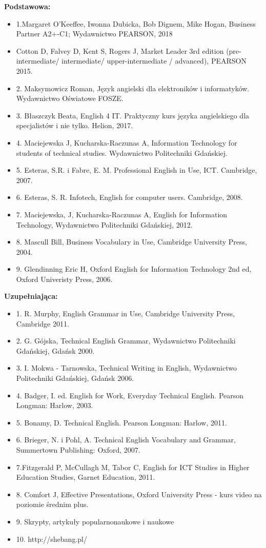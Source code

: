 \documentclass[12pt, a4paper]{article}
\begin{document}
\textbf{Podstawowa:}
\begin{itemize}
  \item 1.Margaret O’Keeffee, Iwonna Dubicka, Bob Dignem, Mike Hogan, Business Partner A2+-C1; Wydawnictwo PEARSON, 2018
  \item Cotton D, Falvey D, Kent S, Rogers J, Market Leader 3rd edition (pre-intermediate/ intermediate/ upper-intermediate / advanced), PEARSON 2015.
  \item 2. Maksymowicz Roman, Język angielski dla elektroników i informatyków. Wydawnictwo Oświatowe FOSZE.
  \item 3. Błaszczyk Beata, English 4 IT. Praktyczny kurs języka angielskiego dla specjalistów i nie tylko. Helion, 2017.
  \item 4. Maciejewska J, Kucharska-Raczunas A, Information Technology for students of technical studies. Wydawnictwo Politechniki Gdańskiej.
  \item 5. Esteras, S.R. i Fabre, E. M. Professional English in Use, ICT. Cambridge, 2007.
  \item 6. Esteras, S. R. Infotech,  English for computer users. Cambridge, 2008.
  \item 7. Maciejewska, J, Kucharska-Raczunas A, English for Information Technology, Wydawnictwo Politechniki Gdańskiej, 2012.
  \item 8. Mascull Bill, Business Vocabulary in Use, Cambridge University Press, 2004.
  \item 9. Glendinning Eric H, Oxford English for Information Technology 2nd ed, Oxford Univeristy Press, 2006.
\end{itemize}

\textbf{Uzupełniająca:}
\begin{itemize}
  \item 1. R. Murphy, English Grammar in Use, Cambridge University Press, Cambridge 2011.
  \item 2. G. Gójska, Technical English Grammar, Wydawnictwo Politechniki Gdańskiej, Gdańsk 2000.
  \item 3. I. Mokwa - Tarnowska, Technical Writing in English, Wydawnictwo Politechniki Gdańskiej, Gdańsk 2006.
  \item 4. Badger, I. ed. English for Work, Everyday Technical English. Pearson Longman: Harlow, 2003.
  \item 5. Bonamy, D. Technical English. Pearson Longman: Harlow, 2011.
  \item 6. Brieger, N. i Pohl, A. Technical English Vocabulary and Grammar, Summertown Publishing: Oxford, 2007.
  \item 7.Fitzgerald P, McCullagh M, Tabor C, English for ICT Studies in Higher Education Studies, Garnet Education, 2011.
  \item 8. Comfort J, Effective Presentations, Oxford University Press - kurs video na poziomie średnim plus.
  \item 9. Skrypty, artykuły popularnonaukowe i naukowe
  \item 10. http://shebang.pl/
\end{itemize}
\end{document}
